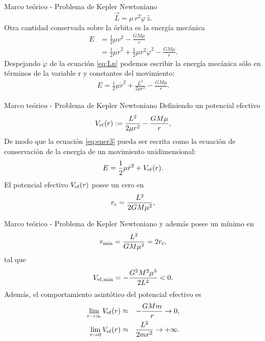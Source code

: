 \begin{frame}{Marco teórico - Problema de Kepler Newtoniano}
\begin{equation}
    \vec{L} = \mu\,r^2\dot{\varphi}\,\hat{z}. \label{eq:Ln}
\end{equation}
Otra cantidad conservada sobre la órbita es la energía mecánica
\begin{align}
    E&=\frac{1}{2}\mu v^2-\frac{GM\mu}{r} \label{eq:ener1}\\
    &=\frac{1}{2}\mu\dot{r}^2+\frac{1}{2}\mu r^2\dot{\varphi}^2-\frac{GM\mu}{r}.\label{eq:ener2}
\end{align}
Despejando $\dot{\varphi}$ de la ecuación \ref{eq:Ln} podemos escribir la energía mecánica sólo en términos de la variable r y constantes del movimiento:
\begin{eqnarray}
    E=\frac{1}{2}\mu\dot{r}^2+\frac{L^2}{2\mu r^2}-\frac{GM\mu}{r} .\label{eq:ener3}
\end{eqnarray}
\end{frame}
\begin{frame}{Marco teórico - Problema de Kepler Newtoniano}
    Definiendo un potencial efectivo
\begin{equation}
    V_{\rm ef}(r):=\frac{L^2}{2\mu r^2}-\frac{GM\mu}{r},
\end{equation}
De modo que la ecuación \ref{eq:ener3} pueda ser escrita como la ecuación de conservación de la energía de un movimiento unidimensional:
\begin{equation}
    E=\frac{1}{2}\mu\dot{r}^2+V_{\rm ef}(r) . \label{eq:EVef}
\end{equation}
    El potencial efectivo $V_{\rm ef}(r)$ posee un cero en
\begin{eqnarray}
    r_{\rm c}=\frac{L^2}{2GM\mu^2} ,\label{eq:cero1}
\end{eqnarray}
\end{frame}
\begin{frame}{Marco teórico - Problema de Kepler Newtoniano}
    \vspace{0.5cm}
    y además posee un mínimo en
    \begin{eqnarray}
    r_{\rm min}=\frac{L^2}{GM\mu^2}=2r_{\rm c},\label{eq:rmin}
    \end{eqnarray}
    tal que
    \begin{eqnarray*}
    V_{\rm ef, min}=-\frac{G^2M^2\mu^3}{2L^2}<0.
    \end{eqnarray*}
    Además, el comportamiento asintótico del potencial efectivo es
    \begin{eqnarray*}
    \lim_{r\to\infty}V_{\rm ef}(r)&\approx&-\frac{GMm}{r}\rightarrow 0,\\
    \lim_{r\to 0}V_{\rm ef}(r)&\approx&\frac{L^2}{2mr^2}\rightarrow +\infty .
    \end{eqnarray*} 
\end{frame}
